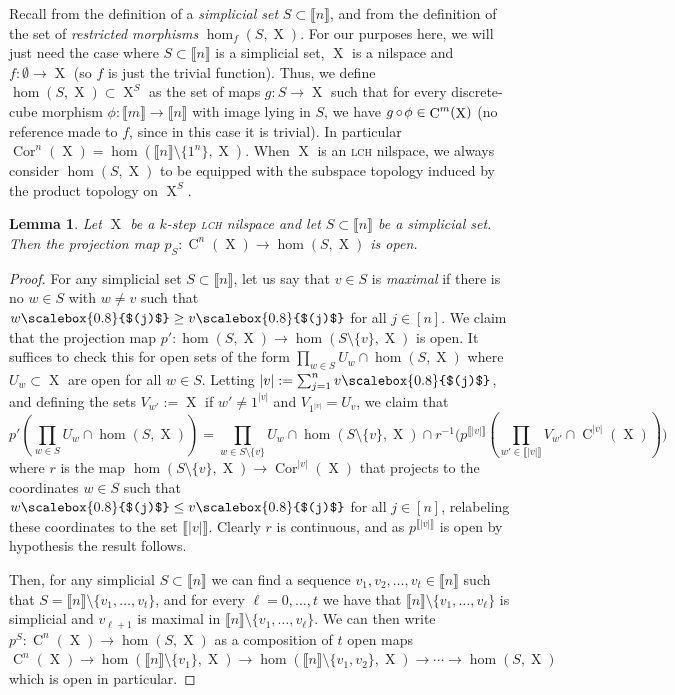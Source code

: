 \documentclass[a4paper,12pt,reqno]{amsart}
\newtheorem{lemma}[theorem]{Lemma}
\theoremstyle{definition}
\def\to{\rightarrow}
\newcommand*{\sbr}[1]{\scalebox{0.8}{$(#1)$}}
\newcommand*{\db}[1]{\llbracket #1\rrbracket}
\DeclareMathOperator{\ns}{X}
\DeclareMathOperator{\co}{\circ\hspace{-0.02 cm}}
\DeclareMathOperator{\cu}{C}
\DeclareMathOperator{\cor}{Cor}
\begin{document}
\noindent Recall from \cite[Definition 3.1.4]{Cand:Notes1} the definition of a \emph{simplicial set} $S\subset \db{n}$, and from \cite[Definition 3.3.10]{Cand:Notes1} the definition of the set of \emph{restricted morphisms} $\hom_f(S,\ns)$. For our purposes here, we will just need the case where $S\subset \db{n}$ is a simplicial set, $\ns$ is a nilspace and $f:\emptyset\to \ns$ (so $f$ is just the trivial function). Thus, we define $\hom(S,\ns)\subset \ns^S$ as the set of maps $g:S\to \ns$ such that for every discrete-cube morphism $\phi:\db{m}\to \db{n}$ with image lying in $S$, we have $g\co\phi\in\cu^m(\ns)$ (no reference made to $f$, since in this case it is trivial). In particular $\cor^n(\ns)=\hom(\db{n}\setminus\{1^n\},\ns)$. When $\ns$ is an \textsc{lch} nilspace, we always consider $\hom(S,\ns)$ to be equipped with the subspace topology induced by the product topology on $\ns^S$.
\begin{lemma}\label{lem:simplicial-proy}
Let $\ns$ be a $k$-step \textsc{lch} nilspace and let $S\subset \db{n}$ be a simplicial set. Then the projection map $p_S:\cu^n(\ns)\to \hom(S,\ns)$ is open.
\end{lemma}
\begin{proof}
For any simplicial set $S\subset \db{n}$, let us say that $v\in S$ is \emph{maximal} if there is no $w\in S$ with $w\not=v$ such that $w\sbr{j}\ge v\sbr{j}$ for all $j\in[n]$. We claim that the projection map $p':\hom(S,\ns)\to\hom({S\setminus\{v\}},\ns)$ is open. It suffices to check this for open sets of the form $\prod_{w\in S} U_w\cap \hom(S,\ns)$ where $U_w\subset \ns$ are open for all $w\in S$. Letting $|v|:=\sum_{j=1}^n v\sbr{j}$, and defining the sets $V_{w'}:=\ns$ if $w'\not=1^{|v|}$ and $V_{1^{|v|}}=U_v$, we claim that
\[
p'(\prod_{w\in S} U_w\cap \hom(S,\ns))= \prod_{w\in S\setminus\{v\}} U_w\cap \hom({S\setminus\{v\}},\ns) \cap r^{-1}\big(p^{\db{|v|}}(\prod_{w'\in \db{|v|}} V_{w'}\cap \cu^{|v|}(\ns))\big)
\]
where $r$ is the map $\hom({S\setminus\{v\}},\ns)\to \cor^{|v|}(\ns)$ that projects to the coordinates $w\in S$ such that $w\sbr{j}\le v\sbr{j}$ for all $j\in[n]$,  relabeling these coordinates to the set $\db{|v|}$. Clearly $r$ is continuous, and as $p^{\db{|v|}}$ is open by hypothesis the result follows.

Then, for any simplicial $S\subset \db{n}$ we can find a sequence $v_1,v_2,\ldots,v_t\in \db{n}$ such that $S=\db{n}\setminus\{v_1,\ldots,v_t\}$, and for every $\ell=0,\ldots,t$ we have that $\db{n}\setminus\{v_1,\ldots,v_\ell\}$ is simplicial and $v_{\ell+1}$ is maximal in $\db{n}\setminus\{v_1,\ldots,v_\ell\}$. We can then write $p^S:\cu^n(\ns)\to\hom(S,\ns)$ as a composition of $t$ open maps $\cu^n(\ns)\to \hom(\db{n}\setminus\{v_1\},\ns)\to \hom(\db{n}\setminus\{v_1,v_2\},\ns)\to \cdots \to\hom(S,\ns)$ which is open in particular.
\end{proof}
\end{document}
